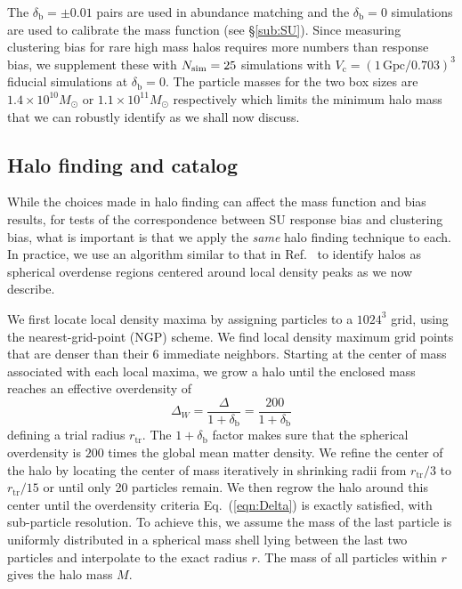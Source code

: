 \documentclass[prd,twocolumn,amsmath,amssymb,floatfix,superscriptaddress]{revtex4-1}
\newcommand{\br}{\textrm{b}}
\newcommand{\VL}{V_\textrm{c}}
\begin{document}
 The $\delta_\br =\pm 0.01$ pairs are used in abundance
matching and the $\delta_\br =0$ simulations are used to calibrate the mass function (see \S\ref{sub:SU}).
Since measuring clustering bias for rare high mass halos requires more numbers
than response bias, we supplement these with 
$N_{\rm sim}=25$ simulations with  $\VL = (1\,\textrm{Gpc}/0.703)^3$ fiducial simulations at $\delta_\br=0$.
The particle masses for the two box sizes are
$1.4\times10^{10}M_\odot$ or $1.1\times10^{11}M_\odot$ respectively which limits the minimum
halo mass that we can robustly identify as we shall now discuss.



\subsection{Halo finding and catalog}
\label{sub:halo}

While the choices made in halo finding can affect the mass function and bias results, 
 for tests of the correspondence between SU response bias and clustering bias, what
is important is that we apply the {\it same} halo finding technique to each.
In practice, we use an algorithm similar to that in Ref.~\cite{TinkerKravEtAl08} to identify halos
as spherical overdense regions centered around local density peaks as we now describe.


We first locate local density maxima by assigning particles to a $1024^3$ grid,
using the nearest-grid-point (NGP) scheme.
We find local density maximum grid points that are denser than their 6 immediate neighbors.
Starting at the center of mass associated with each local maxima,
we grow a halo until the enclosed mass reaches an effective overdensity of
%
\begin{equation}
    \Delta_W =\frac{\Delta}{1+\delta_\br}
    =\frac{200}{1+\delta_\br}
    \label{eqn:Delta}
\end{equation}
%
defining a trial radius $r_\textrm{tr}$. The $1+\delta_\br$ factor makes sure that
the spherical overdensity is $200$ times the global mean matter density.
We refine the center of the halo by
locating the center of mass iteratively in shrinking radii from $r_\textrm{tr}/3$
to $r_\textrm{tr}/15$ or until only 20 particles remain.
We then regrow the halo around this center until the overdensity criteria Eq.~(\ref{eqn:Delta})
is exactly satisfied, with sub-particle resolution.
To achieve this, we assume the mass of the last particle is uniformly distributed
in a spherical mass shell lying between the last two particles and interpolate to the
exact radius $r$.   
The mass of all particles within $r$ gives the halo mass $M$.
\end{document}
